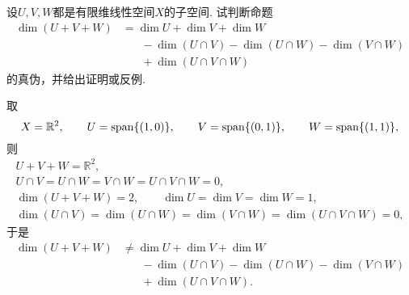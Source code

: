 \begin{example}
设\(U,V,W\)都是有限维线性空间\(X\)的子空间.
试判断命题\begin{align*}
	\dim(U+V+W)
	&= \dim U + \dim V + \dim W \\
	&\hspace{20pt} - \dim(U \cap V) - \dim (U \cap W) - \dim(V \cap W) \\
	&\hspace{20pt} + \dim(U \cap V \cap W)
\end{align*}
的真伪，并给出证明或反例.
\begin{solution}
取\begin{equation*}
	X = \mathbb{R}^2,
	\qquad
	U = \operatorname{span}\{(1,0)\},
	\qquad
	V = \operatorname{span}\{(0,1)\},
	\qquad
	W = \operatorname{span}\{(1,1)\},
\end{equation*}
则\begin{gather*}
	U + V + W = \mathbb{R}^2, \\
	U \cap V
	= U \cap W
	= V \cap W
	= U \cap V \cap W
	= 0, \\
	\dim(U + V + W) = 2,
	\qquad
	\dim U = \dim V = \dim W = 1, \\
	\dim(U \cap V)
	= \dim(U \cap W)
	= \dim(V \cap W)
	= \dim(U \cap V \cap W)
	= 0,
\end{gather*}
于是\begin{align*}
	\dim(U+V+W)
	&\neq \dim U + \dim V + \dim W \\
	&\hspace{20pt} - \dim(U \cap V) - \dim (U \cap W) - \dim(V \cap W) \\
	&\hspace{20pt} + \dim(U \cap V \cap W).
\end{align*}
\end{solution}
\end{example}

